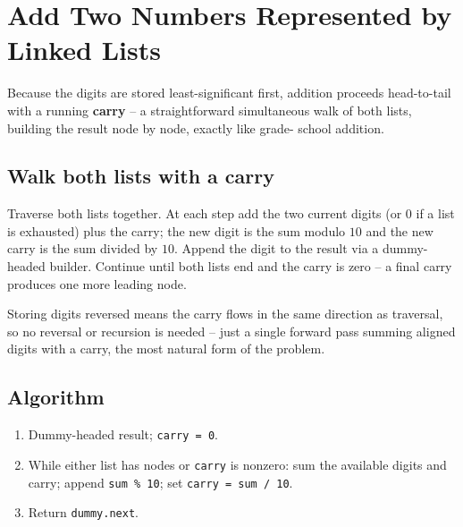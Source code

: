 \section{Add Two Numbers Represented by Linked Lists}
\label{sec:ll-add-two-numbers}


\begin{patternbox}
Because the digits are stored least-significant first, addition proceeds
head-to-tail with a running \textbf{carry} -- a straightforward simultaneous
walk of both lists, building the result node by node, exactly like grade-
school addition.
\end{patternbox}

\subsection*{Walk both lists with a carry}

Traverse both lists together. At each step add the two current digits (or
$0$ if a list is exhausted) plus the carry; the new digit is the sum modulo
$10$ and the new carry is the sum divided by $10$. Append the digit to the
result via a dummy-headed builder. Continue until both lists end and the
carry is zero -- a final carry produces one more leading node.

\begin{ideabox}
Storing digits reversed means the carry flows in the same direction as
traversal, so no reversal or recursion is needed -- just a single forward
pass summing aligned digits with a carry, the most natural form of the
problem.
\end{ideabox}

\subsection*{Algorithm}

\begin{enumerate}
  \item Dummy-headed result; \texttt{carry = 0}.
  \item While either list has nodes or \texttt{carry} is nonzero: sum the
        available digits and carry; append \texttt{sum \% 10}; set
        \texttt{carry = sum / 10}.
  \item Return \texttt{dummy.next}.
\end{enumerate}

